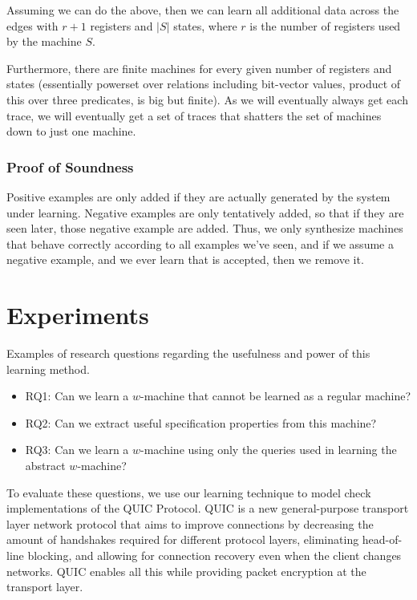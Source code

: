 \documentclass{article}
\begin{document}
Assuming we can do the above, then we can learn all additional data across the edges with $r+1$ registers and $|S|$ states, where $r$ is the number of registers used by the machine $S$.

Furthermore, there are finite machines for every given number of registers and states (essentially powerset over relations including bit-vector values, product of this over three predicates, is big but finite). As we will eventually always get each trace, we will eventually get a set of traces that shatters the set of machines down to just one machine. 

\subsubsection{Proof of Soundness}

Positive examples are only added if they are actually generated by the system under learning.
Negative examples are only tentatively added, so that if they are seen later, those negative example are added.
Thus, we only synthesize machines that behave correctly according to all examples we've seen,
and if we assume a negative example, and we  ever learn that is accepted, then we remove it. 


\section{Experiments}
Examples of research questions regarding the usefulness and power of this learning method. 
\begin{itemize}
    \item RQ1: Can we learn a $w$-machine that cannot be learned as a regular machine?
    \item RQ2: Can we extract useful specification properties from this machine?
    \item RQ3: Can we learn a $w$-machine using only the queries used in learning the abstract $w$-machine?
\end{itemize}

To evaluate these questions, we use our learning technique to model check implementations of the QUIC Protocol. QUIC is a new general-purpose transport layer network protocol that aims to improve connections by decreasing the amount of handshakes required for different protocol layers, eliminating head-of-line blocking, and allowing for connection recovery even when the client changes networks. QUIC enables all this while providing packet encryption at the transport layer. 
\end{document}
